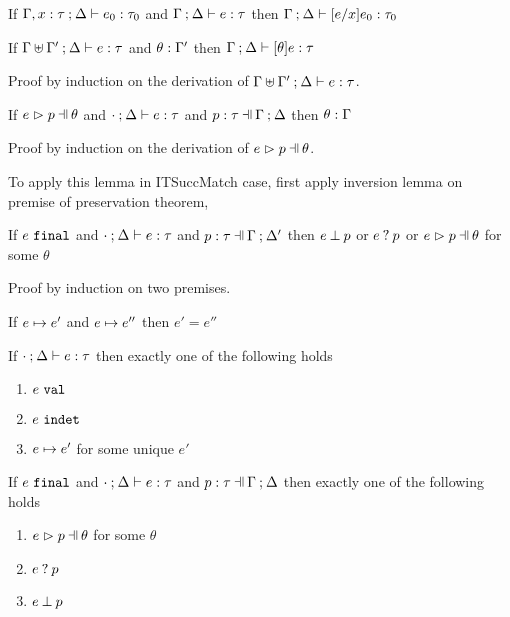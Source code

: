 \begin{lem}[Substitution]
  \label{lem:substitution}
  If $\Gamma, x : \tau \mathbin{;} \Delta \vdash e_0 : \tau_0$ and $\Gamma \mathbin{;} \Delta \vdash e : \tau$
  then $\Gamma \mathbin{;} \Delta \vdash [e/x]e_0 : \tau_0$
\end{lem}

\begin{lem}
  \label{lem:simult-substitution}
  If $\Gamma \uplus \Gamma' \mathbin{;} \Delta \vdash e : \tau$ and $\theta : \Gamma'$
  then $\Gamma \mathbin{;} \Delta \vdash [\theta]e : \tau$
\end{lem}
Proof by induction on the derivation of $\Gamma \uplus \Gamma' \mathbin{;} \Delta \vdash e : \tau$.

\begin{lem}
  \label{lem:subs-typing}
  If $\hpatmatch{e}{p}{\theta}$ and $\cdot \mathbin{;} \Delta \vdash e : \tau$ and $\hpattyp{p}{\tau}{\Gamma}{\Delta}$
  then $\theta : \Gamma$
\end{lem}
Proof by induction on the derivation of $\hpatmatch{e}{p}{\theta}$.

To apply this lemma in ITSuccMatch case, first apply inversion lemma on premise of preservation theorem,

\begin{lem}
  \label{lem:match-progress}
  If $e ~\mathtt{final}$ and $\cdot \mathbin{;} \Delta \vdash e : \tau$ and $\hpattyp{p}{\tau}{\Gamma}{\Delta'}$
  then $e \mathbin{\bot} p$ or $e \mathbin{?} p$ or $\hpatmatch{e}{p}{\theta}$ for some $\theta$
\end{lem}
Proof by induction on two premises.

\begin{thm}
  \label{thrm:step-determinism}
  If $e \mapsto e'$ and $e \mapsto e''$ then $e' = e''$
\end{thm}

\begin{thm}[Determinism]
  \label{thrm:determinism}
  If $\cdot \mathbin{;} \Delta \vdash e : \tau$ then exactly one of the following holds
  \begin{enumerate}
    \item $e ~\mathtt{val}$
    \item $e ~\mathtt{indet}$
    \item $e \mapsto e'$ for some unique $e'$
  \end{enumerate}
\end{thm}

\begin{lem}
  \label{lem:match-determinism}
  If $e ~\mathtt{final}$ and $\cdot \mathbin{;} \Delta \vdash e : \tau$ and $\hpattyp{p}{\tau}{\Gamma}{\Delta}$ then exactly one of the following holds
  \begin{enumerate}
    \item $\hpatmatch{e}{p}{\theta}$ for some $\theta$
    \item $e \mathbin{?} p$
    \item $e \mathbin{\bot} p$
  \end{enumerate}
\end{lem}

